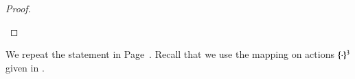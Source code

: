 \begin{proof}
\begin{enumerate}[1.]
	\end{enumerate}
\end{proof}



%

We repeat the statement in Page~\pageref{prop:op_corr_HOpp_to_HOp}.
Recall that we use the mapping on actions $\{\!\!\{\cdot\}\!\!\}^{\mathtt{3}}$ given in .

\begin{proposition}\myrm
	\label{app:prop:op_corr_HOpp_to_HOp}
	
\end{proposition}

